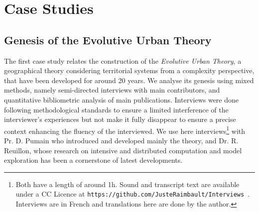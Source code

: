 \documentclass[runningheads,a4paper]{llncs2e/llncs}
\begin{document}
\section{Case Studies}


\subsection{Genesis of the Evolutive Urban Theory}

The first case study relates the construction of the \emph{Evolutive Urban Theory}, a geographical theory considering territorial systems from a complexity perspective, that have been developed for around 20 years. We analyse its genesis using mixed methods, namely semi-directed interviews with main contributors, and quantitative bibliometric analysis of main publications. Interviews were done following methodological standards \cite{legavre1996neutralite} to ensure a limited interference of the interviewer's experiences but not make it fully disappear to ensure a precise context enhancing the fluency of the interviewed. We use here interviews\footnote{Both have a length of around 1h. Sound and transcript text are available under a CC Licence at \texttt{https://github.com/JusteRaimbault/Interviews}~\cite{raimbault2017entretiens}. Interviews are in French and translations here are done by the author.} with Pr. D. Pumain who introduced and developed mainly the theory, and Dr. R. Reuillon, whose research on intensive and distributed computation and model exploration has been a cornerstone of latest developments.
\end{document}
